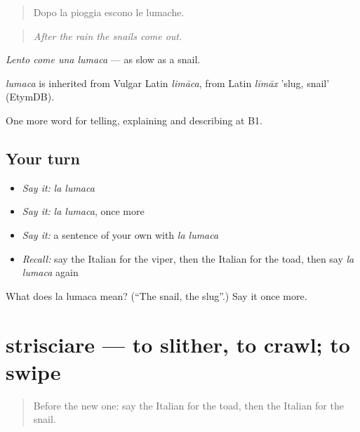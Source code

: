\begin{quote}
Dopo la pioggia escono le lumache.
\end{quote}

\begin{quote}
\emph{After the rain the snails come out.}
\end{quote}

\emph{Lento come una lumaca} — as slow as a snail.

\begin{cousinweb}
\emph{lumaca} is inherited from Vulgar Latin \emph{limāca}, from Latin \emph{līmāx} 'slug, snail' (EtymDB).
\end{cousinweb}

\begin{grammarlens}[title={What you've built}]
One more word for telling, explaining and describing at B1.
\end{grammarlens}

\subsection*{Your turn}
\begin{itemize}
\raggedright
  \item \emph{Say it:} \emph{la lumaca}
  \item \emph{Say it:} \emph{la lumaca}, once more
  \item \emph{Say it:} a sentence of your own with \emph{la lumaca}
  \item \emph{Recall:} say the Italian for the viper, then the Italian for the toad, then say \emph{la lumaca} again
\end{itemize}

\begin{tcolorbox}[breakable,colback=teal!4,colframe=teal!35!black,title={Before you move on}]
What does la lumaca mean? (\textquotedblleft{}The snail, the slug\textquotedblright{}.) Say it once more.
\end{tcolorbox}
\section[strisciare]{strisciare — to slither, to crawl; to swipe}

\label{lesson:IT-C465-strisciare}



\begin{quote}
Before the new one: say the Italian for the toad, then the Italian for the snail.
\end{quote}

